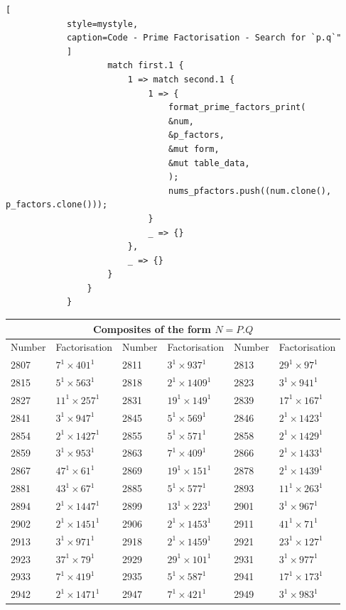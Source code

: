 \documentclass[11pt,a4paper]{article}
\begin{document}
\begin{enumerate}[1.]
\begin{flushleft}
\begin{lstlisting}[
			style=mystyle, 
			caption=Code - Prime Factorisation - Search for `p.q`"  
			]
					match first.1 {
						1 => match second.1 {
							1 => {
								format_prime_factors_print(
								&num,
								&p_factors,
								&mut form,
								&mut table_data,
								);
								nums_pfactors.push((num.clone(), p_factors.clone()));
							}
							_ => {}
						},
						_ => {}
					}
				}
			}
			\end{lstlisting}
			
			\begin{table}[H]
				\begin{adjustbox}{scale=0.9,center}
			\begin{tabular}{ ||p{2cm}|p{2cm}||p{2cm}|p{2cm}||p{2cm}|p{2cm}|| }
				\hline
				\multicolumn{6}{|c|}{Composites of the form $N = P.Q$} \\
				\hline
				Number & Factorisation & Number & Factorisation & Number & Factorisation\\
				\hline
				2807 & $7^1 \times 401^1$ & 2811 & $3^1 \times 937^1$ & 2813 & $29^1 \times 97^1$ \\
				2815 & $5^1 \times 563^1$ & 2818 & $2^1 \times 1409^1$&2823  & $3^1 \times 941^1$ \\
				2827 & $11^1 \times 257^1$& 2831 & $19^1 \times 149^1$&2839  & $17^1 \times 167^1$\\
				2841 & $3^1 \times 947^1$&2845 & $5^1 \times 569^1$&2846 & $2^1 \times 1423^1$ \\
				2854 & $2^1 \times 1427^1$&2855 & $5^1 \times 571^1$&2858 & $2^1 \times 1429^1$\\
				2859 & $3^1 \times 953^1$&2863 & $7^1 \times 409^1$&2866 & $2^1 \times 1433^1$\\
				2867 & $47^1 \times 61^1$&2869 & $19^1 \times 151^1$&2878 & $2^1 \times 1439^1$\\
				2881 & $43^1 \times 67^1$&2885 & $5^1 \times 577^1$&2893 & $11^1 \times 263^1$\\
				2894 & $2^1 \times 1447^1$&2899 & $13^1 \times 223^1$&2901 & $3^1 \times 967^1$\\
				2902 & $2^1 \times 1451^1$&2906 & $2^1 \times 1453^1$&2911 & $41^1 \times 71^1$\\
				2913 & $3^1 \times 971^1$&2918 & $2^1 \times 1459^1$&2921 & $23^1 \times 127^1$\\
				2923 & $37^1 \times 79^1$&2929 & $29^1 \times 101^1$&2931 & $3^1 \times 977^1$\\
				2933 & $7^1 \times 419^1$&2935 & $5^1 \times 587^1$&2941 & $17^1 \times 173^1$\\
				2942 & $2^1 \times 1471^1$&2947 & $7^1 \times 421^1$&2949 & $3^1 \times 983^1$\\

\end{tabular}
\end{adjustbox}
\end{table}
\end{flushleft}
\end{enumerate}
\end{document}
